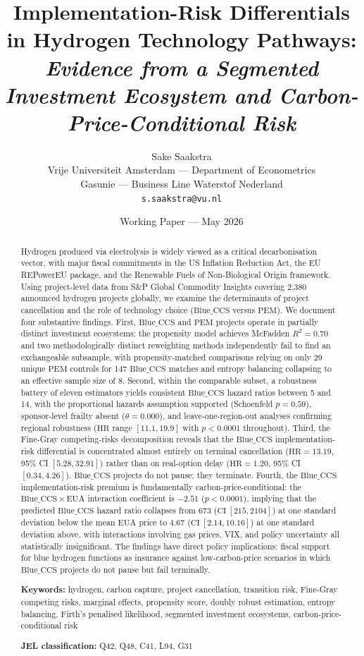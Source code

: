\documentclass[11pt,a4paper]{article}
\title{
  \textbf{Implementation-Risk Differentials in Hydrogen Technology Pathways:}\\
  \large\textit{Evidence from a Segmented Investment Ecosystem and Carbon-Price-Conditional Risk}
}
\author{
  Sake Saakstra\\
  \small Vrije Universiteit Amsterdam --- Department of Econometrics\\
  \small Gasunie --- Business Line Waterstof Nederland\\
  \small \texttt{s.saakstra@vu.nl}
}
\date{Working Paper --- May 2026}
\newcommand{\HR}{\mathrm{HR}}
\newcommand{\BlueCCS}{\mathrm{Blue\_CCS}}
\newcommand{\PEM}{\mathrm{PEM}}
\newcommand{\EUA}{\mathrm{EUA}}
\begin{document}
\maketitle

\begin{abstract}
\noindent Hydrogen produced via electrolysis is widely viewed as a critical decarbonisation vector, with major fiscal commitments in the US Inflation Reduction Act, the EU REPowerEU package, and the Renewable Fuels of Non-Biological Origin framework. Using project-level data from S\&P Global Commodity Insights covering 2,380 announced hydrogen projects globally, we examine the determinants of project cancellation and the role of technology choice ($\BlueCCS$ versus $\PEM$). We document four substantive findings. First, $\BlueCCS$ and $\PEM$ projects operate in partially distinct investment ecosystems: the propensity model achieves McFadden $R^2 = 0.70$ and two methodologically distinct reweighting methods independently fail to find an exchangeable subsample, with propensity-matched comparisons relying on only 29 unique $\PEM$ controls for 147 $\BlueCCS$ matches and entropy balancing collapsing to an effective sample size of 8. Second, within the comparable subset, a robustness battery of eleven estimators yields consistent $\BlueCCS$ hazard ratios between 5 and 14, with the proportional hazards assumption supported (Schoenfeld $p = 0.59$), sponsor-level frailty absent ($\theta = 0.000$), and leave-one-region-out analyses confirming regional robustness ($\HR$ range $[11.1, 19.9]$ with $p < 0.0001$ throughout). Third, the Fine-Gray competing-risks decomposition reveals that the $\BlueCCS$ implementation-risk differential is concentrated almost entirely on terminal cancellation ($\HR = 13.19$, 95\% CI $[5.28, 32.91]$) rather than on real-option delay ($\HR = 1.20$, 95\% CI $[0.34, 4.26]$). $\BlueCCS$ projects do not pause; they terminate. Fourth, the $\BlueCCS$ implementation-risk premium is fundamentally carbon-price-conditional: the $\BlueCCS \times \EUA$ interaction coefficient is $-2.51$ ($p < 0.0001$), implying that the predicted $\BlueCCS$ hazard ratio collapses from $673$ ($\mathrm{CI}\ [215, 2104]$) at one standard deviation below the mean $\EUA$ price to $4.67$ ($\mathrm{CI}\ [2.14, 10.16]$) at one standard deviation above, with interactions involving gas prices, VIX, and policy uncertainty all statistically insignificant. The findings have direct policy implications: fiscal support for blue hydrogen functions as insurance against low-carbon-price scenarios in which $\BlueCCS$ projects do not pause but fail terminally.

\medskip
\noindent\textbf{Keywords:} hydrogen, carbon capture, project cancellation, transition risk, Fine-Gray competing risks, marginal effects, propensity score, doubly robust estimation, entropy balancing, Firth's penalised likelihood, segmented investment ecosystems, carbon-price-conditional risk

\medskip
\noindent\textbf{JEL classification:} Q42, Q48, C41, L94, G31
\end{abstract}
\end{document}
